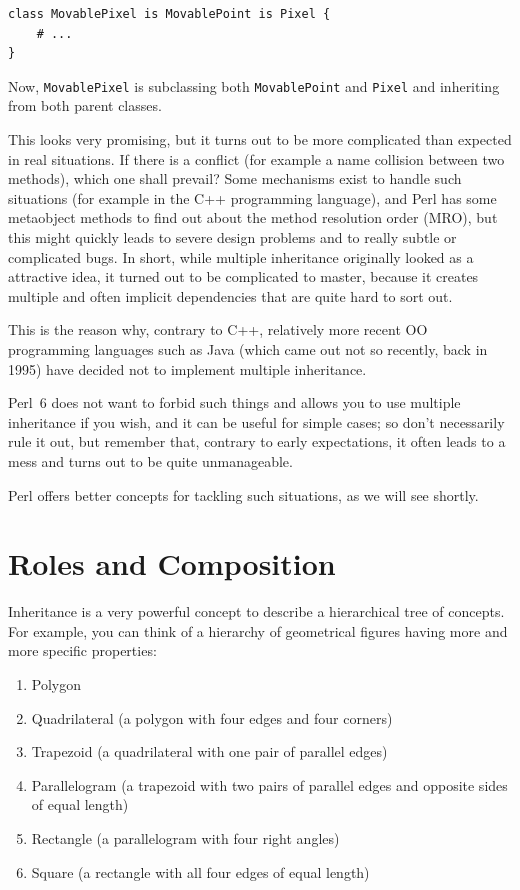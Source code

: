 \begin{verbatim}
class MovablePixel is MovablePoint is Pixel {
    # ...
}
\end{verbatim}

Now, {\tt MovablePixel} is subclassing both 
{\tt MovablePoint} and {\tt Pixel} and inheriting 
from both parent classes.

This looks very promising, but it turns out to be more 
complicated than expected in real situations. If there is a 
conflict (for example a name collision between two methods), 
which one shall prevail? Some mechanisms exist to 
handle such situations (for example in the C++ programming 
language), and Perl has some metaobject methods to find out 
about the method resolution order (MRO), but this 
might quickly leads to severe design 
problems and to really subtle or complicated bugs. In 
short, while multiple inheritance originally looked as a 
attractive idea, it turned out to be complicated to master, 
because it creates multiple and often implicit dependencies 
that are quite hard to sort out.

This is the reason why, contrary to C++, relatively more recent 
OO programming languages such as Java (which came out not 
so recently, back in 1995) have decided not to implement 
multiple inheritance.

Perl~6 does not want to forbid such things and allows you 
to use multiple inheritance if you wish, and it can be useful 
for simple cases; so don't necessarily rule it out, but 
remember that, contrary to early expectations, it often 
leads to a mess and turns out to be quite unmanageable.

Perl offers better concepts for tackling such situations,
as we will see shortly.

\section{Roles and Composition}

Inheritance is a very powerful concept to describe a hierarchical 
tree of concepts. For example, you can think of a hierarchy of 
geometrical figures having more and more specific properties: 
\begin{enumerate}
\item Polygon

\item Quadrilateral (a polygon with four edges and four corners)

\item Trapezoid (a quadrilateral with one pair of parallel edges)

\item Parallelogram (a trapezoid with two pairs of parallel 
edges and opposite sides of equal length)

\item Rectangle (a parallelogram with four right angles)

\item Square (a rectangle with all four edges of equal length)
\end{enumerate}

